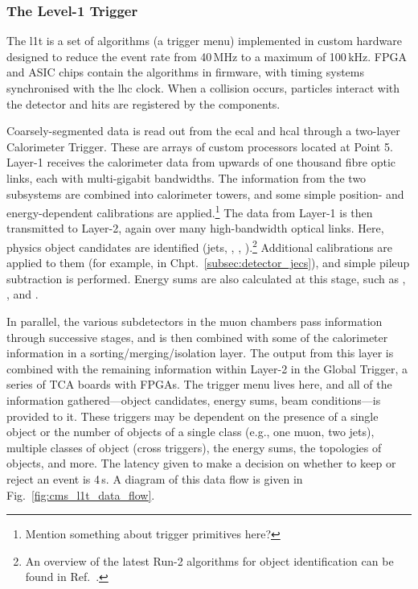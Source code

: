 

\subsubsection{The Level-1 Trigger}
\label{subsubsec:detector_l1t}

The \acrlong{l1t} is a set of algorithms (a trigger menu) implemented in custom hardware designed to reduce the event rate from 40\,MHz to a maximum of 100\,kHz. FPGA and ASIC chips contain the algorithms in firmware, with timing systems synchronised with the \acrshort{lhc} clock. When a collision occurs, particles interact with the detector and hits are registered by the components.

Coarsely-segmented data is read out from the \acrshort{ecal} and \acrshort{hcal} through a two-layer Calorimeter Trigger. These are arrays of custom processors located at Point 5. Layer-1 receives the calorimeter data from upwards of one thousand fibre optic links, each with multi-gigabit bandwidths. The information from the two subsystems are combined into calorimeter towers, and some simple position- and energy-dependent calibrations are applied.\footnote{Mention something about trigger primitives here?} The data from Layer-1 is then transmitted to Layer-2, again over many high-bandwidth optical links. Here, physics object candidates are identified (\glspl{jet}, \Pe, \Pphoton, \Ptau).\footnote{An overview of the latest Run-2 algorithms for object identification can be found in Ref.~.} Additional calibrations are applied to them (for example, in Chpt.~\ref{subsec:detector_jecs}), and simple \gls{pileup} subtraction is performed. Energy sums are also calculated at this stage, such as \etmiss, \HT, and \mht.

In parallel, the various subdetectors in the muon chambers pass information through successive stages, and is then combined with some of the calorimeter information in a sorting/merging/isolation layer. The output from this layer is combined with the remaining information within Layer-2 in the Global Trigger, a series of \si{\micro}TCA boards with FPGAs. The trigger menu lives here, and all of the information gathered---object candidates, energy sums, beam conditions---is provided to it. These triggers may be dependent on the presence of a single object or the number of objects of a single class (e.g., one muon, two \glspl{jet}), multiple classes of object (cross triggers), the energy sums, the topologies of objects, and more. The latency given to make a decision on whether to keep or reject an event is 4\,\si{\micro}s. A diagram of this data flow is given in Fig.~\ref{fig:cms_l1t_data_flow}.

